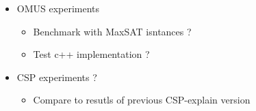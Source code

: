 \begin{itemize}
    \item OMUS experiments
    \begin{itemize}
        \item Benchmark with MaxSAT isntances ? 
        \item Test c++ implementation ?
    \end{itemize}
    \item CSP experiments ? 
    \begin{itemize}
        \item Compare to resutls of previous CSP-explain version
    \end{itemize}
\end{itemize}